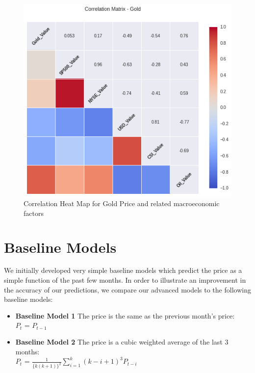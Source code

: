 \documentclass[runningheads]{llncs}
\begin{document}
\begin{figure}
\centering
\includegraphics[width=\textwidth]{Correlation_Gold_Value_.png}
\caption{Correlation Heat Map for Gold Price and related macroeconomic factors}
\label{fig:Correlation_Gold_Value_.png}
\end{figure}

\newpage

\section{Baseline Models}
We initially developed very simple baseline models which predict the price as a simple function of the past few months. In order to illustrate an improvement in the accuracy of our predictions, we compare our advanced models to the following baseline models:

\begin {itemize}
\item \textbf{Baseline Model 1} The price is the same as the previous month's price: \\
$P_{t}$ = $P_{t-1}$\\
\item \textbf{Baseline Model 2} The price is a cubic weighted average of the last 3 months: \\
$P_{t}$ = $\frac{1}{\{k(k+1)\}^2}\sum\limits_{i=1}^k (k-i+1)^3P_{t-i}$
\end {itemize}
\end{document}

